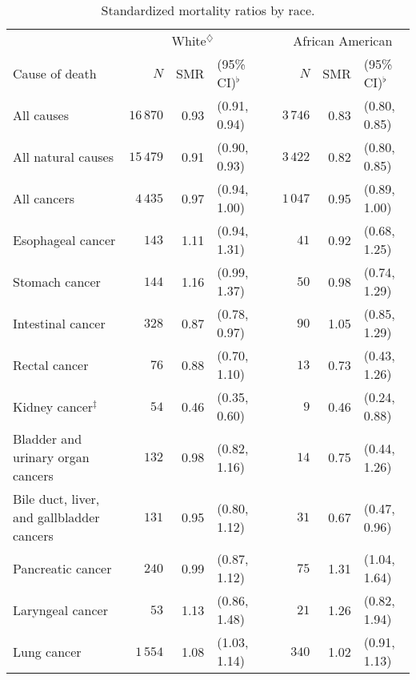 \documentclass[]{article}
\begin{document}
\begin{table}[H]
\centering
\caption{Standardized mortality ratios by race.} 
\begin{tabular}{lrrlcrrl}
  \hline & \multicolumn{3}{c}{White$^\diamondsuit$} && \multicolumn{3}{c}{African American} \\ 
 \cline{2-4}\cline{6-8}
Cause of death & $N$ & SMR & (95\% CI)$^\flat$ &   & $N$ & SMR & (95\% CI)$^\flat$ \\ 
  \midrule
All causes & $16\,870$ & 0.93 &  (0.91, 0.94) &  & $3\,746$ & 0.83 &  (0.80, 0.85) \\ 
  All natural causes & $15\,479$ & 0.91 &  (0.90, 0.93) &  & $3\,422$ & 0.82 &  (0.80, 0.85) \\ 
  All cancers & $4\,435$ & 0.97 &  (0.94, 1.00) &  & $1\,047$ & 0.95 &  (0.89, 1.00) \\ 
  \hspace{10pt}Esophageal cancer & $143$ & 1.11 &  (0.94, 1.31) &  & $41$ & 0.92 &  (0.68, 1.25) \\ 
  \hspace{10pt}Stomach cancer & $144$ & 1.16 &  (0.99, 1.37) &  & $50$ & 0.98 &  (0.74, 1.29) \\ 
  \hspace{10pt}Intestinal cancer & $328$ & 0.87 &  (0.78, 0.97) &  & $90$ & 1.05 &  (0.85, 1.29) \\ 
  \hspace{10pt}Rectal cancer & $76$ & 0.88 &  (0.70, 1.10) &  & $13$ & 0.73 &  (0.43, 1.26) \\ 
  \hspace{10pt}Kidney cancer$^\ddagger$ & $54$ & 0.46 &  (0.35, 0.60) &  & $9$ & 0.46 &  (0.24, 0.88) \\ 
  \hspace{10pt}Bladder and urinary organ cancers & $132$ & 0.98 &  (0.82, 1.16) &  & $14$ & 0.75 &  (0.44, 1.26) \\ 
  \hspace{10pt}Bile duct, liver, and gallbladder cancers & $131$ & 0.95 &  (0.80, 1.12) &  & $31$ & 0.67 &  (0.47, 0.96) \\ 
  \hspace{10pt}Pancreatic cancer & $240$ & 0.99 &  (0.87, 1.12) &  & $75$ & 1.31 &  (1.04, 1.64) \\ 
  \hspace{10pt}Laryngeal cancer & $53$ & 1.13 &  (0.86, 1.48) &  & $21$ & 1.26 &  (0.82, 1.94) \\ 
  \hspace{10pt}Lung cancer & $1\,554$ & 1.08 &  (1.03, 1.14) &  & $340$ & 1.02 &  (0.91, 1.13) \\ 

\end{tabular}
\end{table}
\end{document}
